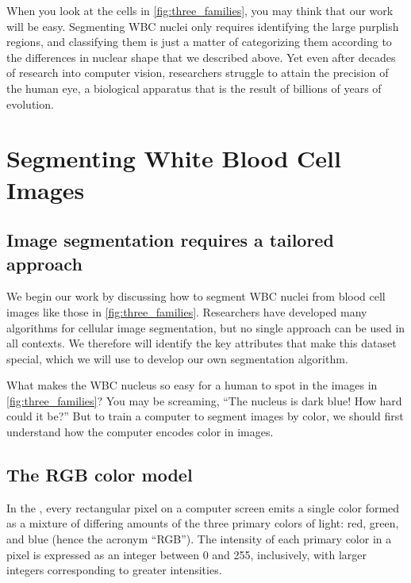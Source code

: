 When you look at the cells in \autoref{fig:three_families}, you may think that our work will be easy. Segmenting WBC nuclei only requires identifying the large purplish regions, and classifying them is just a matter of categorizing them according to the differences in nuclear shape that we described above. Yet even after decades of research into computer vision, researchers struggle to attain the precision of the human eye, a biological apparatus that is the result of billions of years of evolution.\\

\FloatBarrier
{}

\section{Segmenting White Blood Cell Images}
\label{sec:segmenting_white_blood_cell_images}
\subsection{Image segmentation requires a tailored approach}

We begin our work by discussing how to segment WBC nuclei from blood cell images like those in \autoref{fig:three_families}. Researchers have developed many algorithms for cellular image segmentation, but no single approach can be used in all contexts. We therefore will identify the key attributes that make this dataset special, which we will use to develop our own segmentation algorithm.

What makes the WBC nucleus so easy for a human to spot in the images in \autoref{fig:three_families}? You may be screaming, ``The nucleus is dark blue! How hard could it be?'' But to train a computer to segment images by color, we should first understand how the computer encodes color in images.

\FloatBarrier
{}
\subsection{The RGB color model}

In the , every rectangular pixel on a computer screen emits a single color formed as a mixture of differing amounts of the three primary colors of light: red, green, and blue (hence the acronym ``RGB''). The intensity of each primary color in a pixel is expressed as an integer between 0 and 255, inclusively, with larger integers corresponding to greater intensities.

